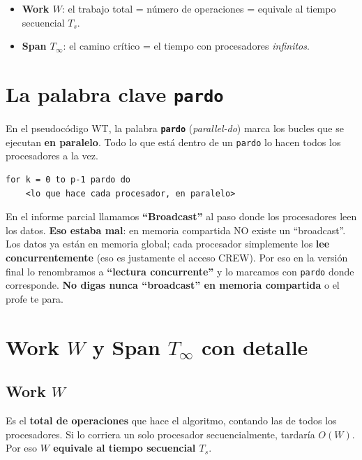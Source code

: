 \documentclass[11pt,a4paper]{article}
\newcommand{\term}[1]{\textbf{\textcolor{clave}{#1}}}
\begin{document}
\begin{itemize}
  \item \term{Work $W$}: el trabajo total = número de operaciones = equivale al
        tiempo secuencial $T_s$.
  \item \term{Span $T_\infty$}: el camino crítico = el tiempo con procesadores
        \emph{infinitos}.
\end{itemize}

\section{La palabra clave \texttt{pardo}}

En el pseudocódigo WT, la palabra \term{\texttt{pardo}} (\emph{parallel-do})
marca los bucles que se ejecutan \textbf{en paralelo}. Todo lo que está dentro de
un \texttt{pardo} lo hacen todos los procesadores a la vez.

\begin{verbatim}
for k = 0 to p-1 pardo do
    <lo que hace cada procesador, en paralelo>
\end{verbatim}

\begin{importante}[title=\textbf{Corrección clave del parcial}]
En el informe parcial llamamos \textbf{``Broadcast''} al paso donde los
procesadores leen los datos. \textbf{Eso estaba mal}: en memoria compartida NO
existe un ``broadcast''. Los datos ya están en memoria global; cada procesador
simplemente los \textbf{lee concurrentemente} (eso es justamente el acceso CREW).
Por eso en la versión final lo renombramos a \textbf{``lectura concurrente''} y
lo marcamos con \texttt{pardo} donde corresponde. \textbf{No digas nunca
``broadcast'' en memoria compartida} o el profe te para.
\end{importante}

\section{Work $W$ y Span $T_\infty$ con detalle}

\subsection{Work $W$}
Es el \textbf{total de operaciones} que hace el algoritmo, contando las de todos
los procesadores. Si lo corriera un solo procesador secuencialmente, tardaría
$O(W)$. Por eso \textbf{$W$ equivale al tiempo secuencial $T_s$}.
\end{document}
